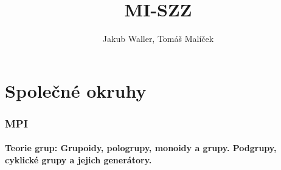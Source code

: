 \documentclass[a4paper,hidelinks]{article}
\title{MI-SZZ}
\author{Jakub Waller, Tomáš Malíček}
\begin{document}
\maketitle

\tableofcontents


\newpage
\part{Společné okruhy}


\section{MPI}

\subsection{Teorie grup: Grupoidy, pologrupy, monoidy a grupy. Podgrupy, cyklické grupy a jejich generátory.}
\end{document}
